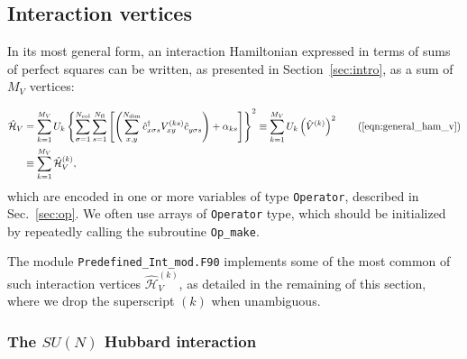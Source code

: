 %
\subsection{Interaction vertices} \label{sec:interaction_vertices}

In its most general form, an interaction Hamiltonian expressed in terms of sums of perfect squares can be written, as presented in Section~\ref{sec:intro}, as a sum of $M_V$ vertices: %

\begin{align*}
\hat{\mathcal{H}}_{V} &=  \sum\limits_{k=1}^{M_V}U_{k}
\left\{ \sum\limits_{\sigma=1}^{N_{\mathrm{col}}}
\sum\limits_{s=1}^{N_{\mathrm{fl}}} \left[ \left(
\sum\limits_{x,y}^{N_{\mathrm{dim}}} \hat{c}^{\dagger}_{x \sigma s}V_{xy}^{(k s)}\hat{c}^{\phantom\dagger}_{y \sigma s}\right)  +\alpha_{k s}  \right] \right\}^{2}
\equiv    \sum\limits_{k=1}^{M_V}U_{k}   \left(\hat{V}^{(k)} \right)^2 \tag{\ref{eqn:general_ham_v}}\\
&\equiv    \sum\limits_{k=1}^{M_V}\hat{\mathcal{H}}_V^{(k)},
\end{align*}
which are encoded in one or more variables of type \texttt{Operator}, described in Sec.~\ref{sec:op}. We often use arrays of \texttt{Operator} type, which should be initialized by repeatedly calling the subroutine \texttt{Op\_make}.

The module \texttt{Predefined\_Int\_mod.F90} implements some of the most common of such interaction vertices $\hat{\mathcal{H}}_V^{(k)}$, as detailed in the remaining of this section, where we drop the superscript $(k)$ when unambiguous.


\subsubsection{The $SU(N)$ Hubbard interaction}

